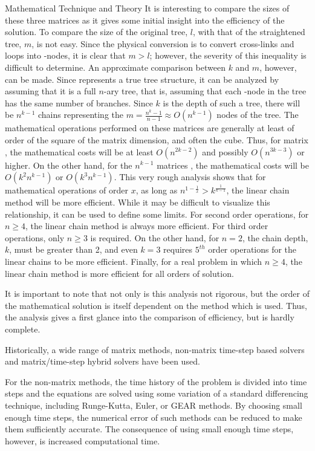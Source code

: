 \begin{chapter}{Mathematical Technique and Theory}
It is interesting to compare the sizes of these three matrices as it
gives some initial insight into the efficiency of the solution.  To
compare the size of the original tree, $l$, with that of the
straightened tree, $m$, is not easy.  Since the physical conversion is
to convert cross-links and loops into \pc-nodes, it is clear that $m >
l$; however, the severity of this inequality is difficult to
determine.  An approximate comparison between $k$ and $m$, however,
can be made.  Since  represents a true tree structure, it can
be analyzed by assuming that it is a full $n$-ary tree, that is,
assuming that each \pc-node in the tree has the same number of
branches.  Since $k$ is the depth of such a tree, there will be
$n^{k-1}$ chains representing the $m = \frac{n^k -1}{n-1} \approx
O(n^{k-1})$ nodes of the tree.  The mathematical operations performed
on these matrices are generally at least of order of the square of the
matrix dimension, and often the cube.  Thus, for matrix , the
mathematical costs will be at least $O(n^{2k-2})$ and possibly
$O(n^{3k-3})$ or higher.  On the other hand, for the $n^{k-1}$
matrices , the mathematical costs will be $O(k^2n^{k-1})$ or
$O(k^3n^{k-1})$.  This very rough analysis shows that for mathematical
operations of order $x$, as long as $n^{1-\frac{1}{x}} >
k^{\frac{1}{k-1}}$, the linear chain method will be more efficient.
While it may be difficult to visualize this relationship, it can be
used to define some limits.  For second order operations, for $n \geq
4$, the linear chain method is always more efficient.  For third order
operations, only $n \geq 3$ is required.  On the other hand, for $n =
2$, the chain depth, $k$, must be greater than 2, and even $k = 3$
requires $5^{th}$ order operations for the linear chains to be more
efficient.  Finally, for a real problem in which $n \geq 4$, the
linear chain method is more efficient for all orders of solution.

It is important to note that not only is this analysis not rigorous,
but the order of the mathematical solution is itself dependent on the
method which is used.  Thus, the analysis gives a first glance into
the comparison of efficiency, but is hardly complete.

Historically, a wide range of matrix methods, non-matrix time-step
based solvers and matrix/time-step hybrid solvers have been used.

For the non-matrix methods, the time history of the problem is divided
into time steps and the equations are solved using some variation of a
standard differencing technique, including Runge-Kutta, Euler, or GEAR
methods.  By choosing small enough time steps, the numerical error of
such methods can be reduced to make them sufficiently accurate.  The
consequence of using small enough time steps, however, is increased
computational time.  


\end{chapter}
